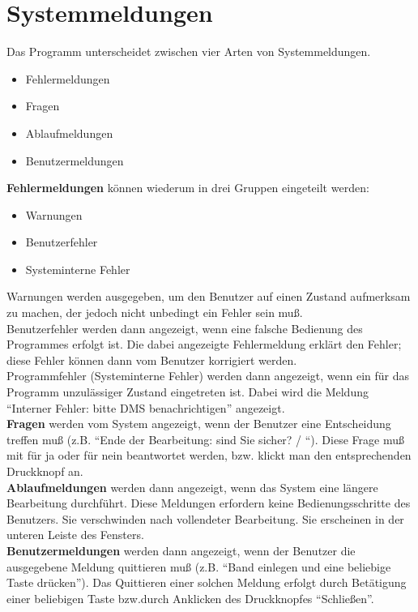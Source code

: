\section{Systemmeldungen} 
  

Das Programm unterscheidet zwischen vier Arten von Systemmeldungen.
\begin{itemize}
\item Fehlermeldungen
\item Fragen
\item Ablaufmeldungen
\item Benutzermeldungen
\end{itemize}

{\bf Fehlermeldungen}  k\"{o}nnen wiederum in drei Gruppen
eingeteilt werden:

\begin{itemize}
\item Warnungen
\item Benutzerfehler
\item Systeminterne Fehler
\end{itemize}

Warnungen werden ausgegeben, um den Benutzer auf einen Zustand
aufmerksam zu machen, der jedoch nicht unbedingt ein Fehler sein
mu{\ss}.\\
Benutzerfehler werden dann angezeigt, wenn eine falsche Bedienung
des Programmes erfolgt ist. Die dabei angezeigte Fehlermeldung erkl\"{a}rt
den Fehler; diese Fehler k\"{o}nnen dann vom Benutzer korrigiert werden.\\
Programmfehler (Systeminterne Fehler) werden dann angezeigt, wenn
ein f\"{u}r das Programm unzul\"{a}ssiger Zustand eingetreten ist. Dabei
wird die Meldung ``Interner Fehler: bitte DMS benachrichtigen'' angezeigt.\\

{\bf Fragen}  werden vom System angezeigt, wenn der Benutzer eine
Entscheidung treffen mu{\ss} (z.B. ``Ende der Bearbeitung: sind Sie
sicher? / ``). Diese Frage mu{\ss} mit  f\"{u}r
ja oder  f\"{u}r nein beantwortet werden, bzw. klickt man den
entsprechenden Druckknopf an.\\

{\bf Ablaufmeldungen}
werden dann angezeigt, wenn das System eine l\"{a}ngere Bearbeitung
durchf\"{u}hrt. Diese Meldungen erfordern keine Bedienungsschritte des
Benutzers. Sie verschwinden nach vollendeter Bearbeitung. Sie erscheinen in der unteren Leiste des Fensters.\\

{\bf Benutzermeldungen} werden dann angezeigt, wenn der
Benutzer die ausgegebene Meldung quittieren mu{\ss} (z.B. ``Band
einlegen und eine beliebige Taste dr\"{u}cken''). Das Quittieren einer
solchen Meldung erfolgt durch Bet\"{a}tigung einer beliebigen Taste bzw.durch
Anklicken des Druckknopfes ``Schlie{\ss}en''.
